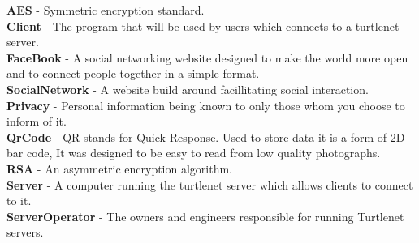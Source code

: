 
\textbf{AES} - Symmetric encryption standard.\\
\textbf{Client} - The program that will be used by users which connects to a turtlenet server.\\
\textbf{FaceBook} - A social networking website designed to make the world more open and to connect people together in a simple format.\\
\textbf{SocialNetwork} - A website build around facillitating social interaction.\\
\textbf{Privacy} - Personal information being known to only those whom you choose to inform of it.\\
\textbf{QrCode} - QR stands for Quick Response.  Used to store data it is a form of 2D bar code, It was designed to be easy to read from low quality photographs.\\
\textbf{RSA} - An asymmetric encryption algorithm.\\
\textbf{Server} - A computer running the turtlenet server which allows clients to connect to it.\\
\textbf{ServerOperator} - The owners and engineers responsible for running Turtlenet servers.\\
